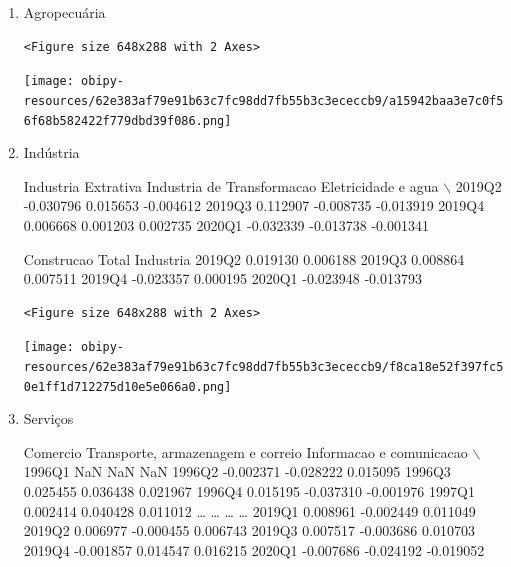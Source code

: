 \documentclass[11pt]{article}
\begin{document}
\begin{enumerate}
\item Agropecuária
\label{sec:org4a717ee}

\begin{verbatim}
<Figure size 648x288 with 2 Axes>
\end{verbatim}


\begin{center}
\texttt{[image: obipy-resources/62e383af79e91b63c7fc98dd7fb55b3c3ececcb9/a15942baa3e7c0f56f68b582422f779dbd39f086.png]}
\end{center}

\item Indústria
\label{sec:org3c13022}

        Industria Extrativa  Industria de Transformacao  Eletricidade e agua  $\backslash$
2019Q2            -0.030796                    0.015653            -0.004612   
2019Q3             0.112907                   -0.008735            -0.013919   
2019Q4             0.006668                    0.001203             0.002735   
2020Q1            -0.032339                   -0.013738            -0.001341   

        Construcao  Total Industria  
2019Q2    0.019130         0.006188  
2019Q3    0.008864         0.007511  
2019Q4   -0.023357         0.000195  
2020Q1   -0.023948        -0.013793  

\begin{verbatim}
<Figure size 648x288 with 2 Axes>
\end{verbatim}


\begin{center}
\texttt{[image: obipy-resources/62e383af79e91b63c7fc98dd7fb55b3c3ececcb9/f8ca18e52f397fc50e1ff1d712275d10e5e066a0.png]}
\end{center}


\item Serviços
\label{sec:org7fb67ce}

        Comercio  Transporte, armazenagem e correio  Informacao e comunicacao  $\backslash$
1996Q1       NaN                                NaN                       NaN   
1996Q2 -0.002371                          -0.028222                  0.015095   
1996Q3  0.025455                           0.036438                  0.021967   
1996Q4  0.015195                          -0.037310                 -0.001976   
1997Q1  0.002414                           0.040428                  0.011012   
\ldots{}          \ldots{}                                \ldots{}                       \ldots{}   
2019Q1  0.008961                          -0.002449                  0.011049   
2019Q2  0.006977                          -0.000455                  0.006743   
2019Q3  0.007517                          -0.003686                  0.010703   
2019Q4 -0.001857                           0.014547                  0.016215   
2020Q1 -0.007686                          -0.024192                 -0.019052   


\end{enumerate}
\end{document}
